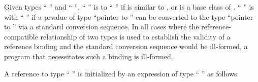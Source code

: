 \pnum
Given types `` '' and `` '',
`` '' is  to
`` '' if
 is similar to , or
 is a base class of .
`` '' is 
with `` '' if
a prvalue of type ``pointer to  '' can be converted to
the type ``pointer to  ''
via a standard conversion sequence.
In all cases where the reference-compatible relationship
of two types is used to establish the validity of a reference binding and
the standard conversion sequence would be ill-formed,
a program that necessitates such a binding is ill-formed.

\pnum
A reference to type `` '' is initialized by
an expression of type `` '' as follows:%

